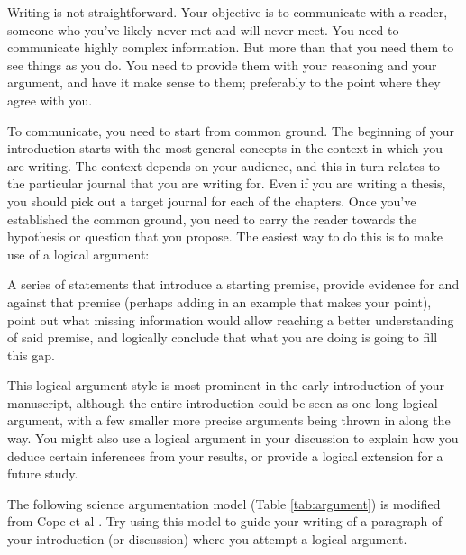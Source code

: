 \documentclass[
]{krantz}
\begin{document}
Writing is not straightforward. Your objective is to communicate with a reader, someone who you've likely never met and will never meet. You need to communicate highly complex information. But more than that you need them to see things as you do. You need to provide them with your reasoning and your argument, and have it make sense to them; preferably to the point where they agree with you.

To communicate, you need to start from common ground. The beginning of your introduction starts with the most general concepts in the context in which you are writing. The context depends on your audience, and this in turn relates to the particular journal that you are writing for. Even if you are writing a thesis, you should pick out a target journal for each of the chapters. Once you've established the common ground, you need to carry the reader towards the hypothesis or question that you propose. The easiest way to do this is to make use of a logical argument:

A series of statements that introduce a starting premise, provide evidence for and against that premise (perhaps adding in an example that makes your point), point out what missing information would allow reaching a better understanding of said premise, and logically conclude that what you are doing is going to fill this gap.

This logical argument style is most prominent in the early introduction of your manuscript, although the entire introduction could be seen as one long logical argument, with a few smaller more precise arguments being thrown in along the way. You might also use a logical argument in your discussion to explain how you deduce certain inferences from your results, or provide a logical extension for a future study.

The following science argumentation model (Table \ref{tab:argument}) is modified from Cope et al \citeyearpar{cope2013science}. Try using this model to guide your writing of a paragraph of your introduction (or discussion) where you attempt a logical argument.
\end{document}
